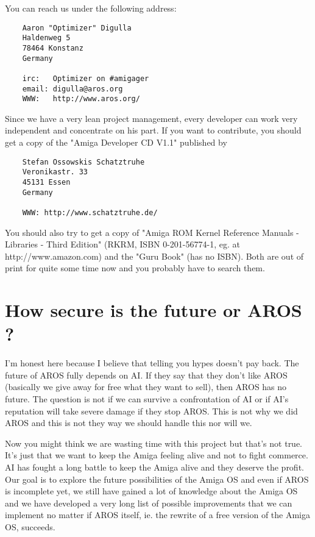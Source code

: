 You can reach us under the following address:

\begin{verbatim}
    Aaron "Optimizer" Digulla
    Haldenweg 5
    78464 Konstanz
    Germany

    irc:   Optimizer on #amigager
    email: digulla@aros.org
    WWW:   http://www.aros.org/
\end{verbatim}

Since we have a very lean project management, every developer can work
very independent and concentrate on his part. If you want to contribute,
you should get a copy of the "Amiga Developer CD V1.1" published by

\begin{verbatim}
    Stefan Ossowskis Schatztruhe
    Veronikastr. 33
    45131 Essen
    Germany

    WWW: http://www.schatztruhe.de/
\end{verbatim}

You should also try to get a copy of "Amiga ROM Kernel Reference Manuals -
Libraries - Third Edition" (RKRM, ISBN 0-201-56774-1,
eg. at http://www.amazon.com) and the "Guru Book" (has no ISBN). Both are
out of print for quite some time now and you probably have to search them.

\section{How secure is the future or AROS ?}

I'm honest here because I believe that telling you hypes doesn't pay back.
The future of AROS fully depends on AI. If they say that they don't like
AROS (basically we give away for free what they want to sell), then AROS
has no future. The question is not if we can survive a confrontation of
AI or if AI's reputation will take severe damage if they stop AROS. This
is not why we did AROS and this is not they way we should handle this nor
will we.

Now you might think we are wasting time with this project but that's not
true. It's just that we want to keep the Amiga feeling alive and not to
fight commerce. AI has fought a long battle to keep the Amiga alive and
they deserve the profit. Our goal is to explore the future possibilities
of the Amiga OS and even if AROS is incomplete yet, we still have gained a
lot of knowledge about the Amiga OS and we have developed a very long list
of possible improvements that we can implement no matter if AROS itself,
ie. the rewrite of a free version of the Amiga OS, succeeds.

